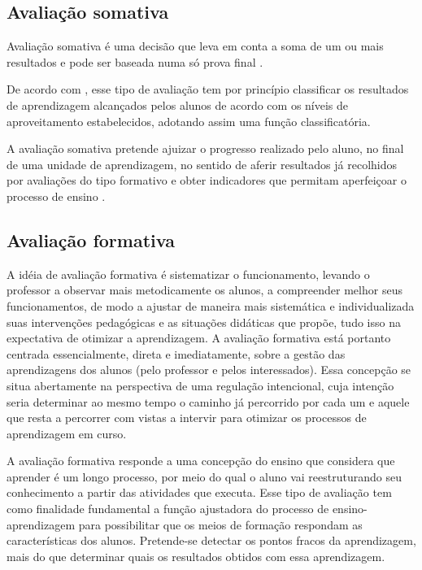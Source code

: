 \documentclass[
	12pt,				%
	openright,			%
	oneside,
	a4paper,			%
	english,			%
	french,				%
	spanish,			%
	brazil,				%
	]{abntex2}
\begin{document}
\subsection{Avaliação somativa}
\label{sec:AvaSom}
Avaliação somativa é uma decisão que leva em conta a soma de um ou mais resultados e pode ser baseada numa só prova final \cite{e2004aprender}.

De acordo com , esse tipo de avaliação tem por princípio classificar os resultados de aprendizagem alcançados pelos alunos de acordo com os níveis de aproveitamento estabelecidos, adotando assim uma função classificatória.

A avaliação somativa pretende ajuizar o progresso realizado pelo aluno, no final de uma unidade de aprendizagem, no sentido de aferir resultados já recolhidos por avaliações do tipo formativo e obter indicadores que permitam aperfeiçoar o processo de ensino \cite{kraemer2005avaliaccao}.

\subsection{Avaliação formativa}
\label{sec:AvaFor}
A idéia de avaliação formativa é sistematizar o funcionamento, levando o professor a
observar mais metodicamente os alunos, a compreender melhor seus funcionamentos, de modo
a ajustar de maneira mais sistemática e individualizada suas intervenções pedagógicas e as
situações didáticas que propõe, tudo isso na expectativa de otimizar a aprendizagem. A
avaliação formativa está portanto centrada essencialmente, direta e imediatamente, sobre a gestão das aprendizagens dos alunos (pelo professor e pelos interessados). Essa concepção se situa abertamente na perspectiva de uma regulação intencional, cuja intenção seria determinar ao mesmo tempo o caminho já percorrido por cada um e aquele que resta a percorrer com vistas a intervir para otimizar os processos de aprendizagem em curso. \cite{perrenoud1999avaliaccao}

A avaliação formativa responde a uma concepção do ensino que considera que aprender é um longo processo, por meio do qual o aluno vai reestruturando seu conhecimento a partir das atividades que executa. Esse tipo de avaliação tem como finalidade fundamental a função ajustadora do processo de ensino-aprendizagem para possibilitar que os meios de formação respondam as características dos alunos. Pretende-se detectar os pontos fracos da aprendizagem, mais do que determinar quais os resultados obtidos com essa aprendizagem. \cite{jorba2003funccao}
\end{document}
